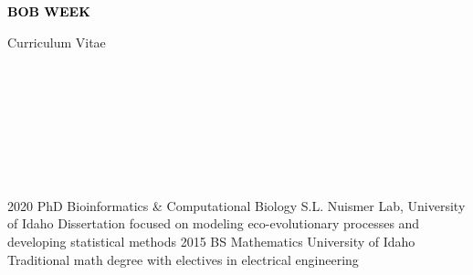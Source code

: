 \documentclass[9pt]{developercv} %
\begin{document}

\begin{minipage}[t]{0.5\textwidth} 
	\vspace{-\baselineskip} %
	
	{ \fontsize{16}{20} \textcolor{black}{\textbf{\MakeUppercase{Bob Week}}}} %
	
	\vspace{6pt}
	
	{\Large Curriculum Vitae} %
\end{minipage}
\hfill
\begin{minipage}[t]{0.2\textwidth} %
	\vspace{-\baselineskip} %
	
	\\
    \\
    \\
	
\end{minipage}
\begin{minipage}[t]{0.27\textwidth} %
	\vspace{-\baselineskip} %
	
	\\
    \\
    \\
\end{minipage}

\vspace{-10 pt}
\begin{entrylist}
    \entry
		{2020}
		{PhD Bioinformatics \& Computational Biology}
		{S.L. Nuismer Lab, University of Idaho}
		{Dissertation focused on modeling eco-evolutionary processes and developing statistical methods}
    \entry
		{2015}
		{BS Mathematics}
		{University of Idaho}
		{Traditional math degree with electives in electrical engineering}
\end{entrylist}
\end{document}

